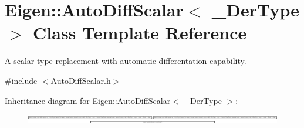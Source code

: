 \hypertarget{class_eigen_1_1_auto_diff_scalar}{}\section{Eigen\+:\+:Auto\+Diff\+Scalar$<$ \+\_\+\+Der\+Type $>$ Class Template Reference}
\label{class_eigen_1_1_auto_diff_scalar}


A scalar type replacement with automatic differentation capability.  




{\ttfamily \#include $<$Auto\+Diff\+Scalar.\+h$>$}

Inheritance diagram for Eigen\+:\+:Auto\+Diff\+Scalar$<$ \+\_\+\+Der\+Type $>$\+:\begin{figure}[H]
\begin{center}
\leavevmode
\includegraphics[height=0.426504cm]{class_eigen_1_1_auto_diff_scalar}
\end{center}
\end{figure}
